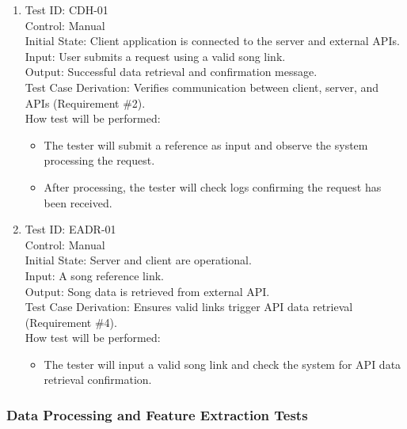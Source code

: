 \documentclass[12pt, titlepage]{article}
\begin{document}
\begin{enumerate}

\item Test ID: CDH-01\\
Control: Manual\\
Initial State: Client application is connected to the server and external APIs.\\
Input: User submits a request using a valid song link.\\
Output: Successful data retrieval and confirmation message.\\
Test Case Derivation: Verifies communication between client, server, and APIs (Requirement \#2).\\
How test will be performed:
\begin{itemize}
    \item The tester will submit a reference as input and observe the system processing the request.
    \item After processing, the tester will check logs confirming the request has been received.
\end{itemize}

\item Test ID: EADR-01\\
Control: Manual\\
Initial State: Server and client are operational.\\
Input: A song reference link.\\
Output: Song data is retrieved from external API.\\
Test Case Derivation: Ensures valid links trigger API data retrieval (Requirement \#4).\\
How test will be performed:
\begin{itemize}
    \item The tester will input a valid song link and check the system for API data retrieval confirmation.
\end{itemize}

\end{enumerate}

\subsubsection{Data Processing and Feature Extraction Tests}
\end{document}
